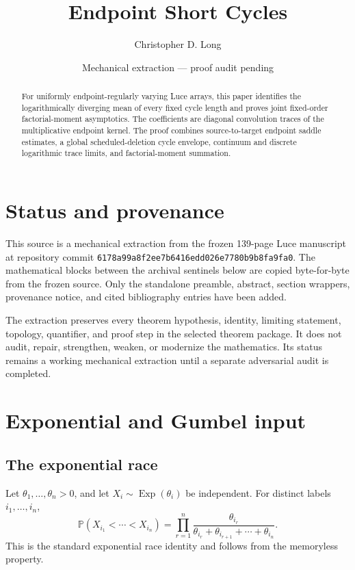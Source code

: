 \documentclass[11pt]{article}
\title{Endpoint Short Cycles}
\author{Christopher D. Long}
\date{Mechanical extraction --- proof audit pending}
\theoremstyle{remark}
\newcommand{\Pp}{\mathbb P}
\newcommand{\Exp}{\operatorname{Exp}}
\begin{document}
\maketitle
\begin{abstract}
For uniformly endpoint-regularly varying Luce arrays, this paper identifies the logarithmically diverging mean of every fixed cycle length and proves joint fixed-order factorial-moment asymptotics. The coefficients are diagonal convolution traces of the multiplicative endpoint kernel. The proof combines source-to-target endpoint saddle estimates, a global scheduled-deletion cycle envelope, continuum and discrete logarithmic trace limits, and factorial-moment summation.
\end{abstract}
\tableofcontents
\section{Status and provenance}
This source is a mechanical extraction from the frozen 139-page Luce manuscript at repository commit \texttt{6178a99a8f2ee7b6416edd026e7780b9b8fa9fa0}. The mathematical blocks between the archival sentinels below are copied byte-for-byte from the frozen source. Only the standalone preamble, abstract, section wrappers, provenance notice, and cited bibliography entries have been added.

The extraction preserves every theorem hypothesis, identity, limiting statement, topology, quantifier, and proof step in the selected theorem package. It does not audit, repair, strengthen, weaken, or modernize the mathematics. Its status remains a working mechanical extraction until a separate adversarial audit is completed.

\section{Exponential and Gumbel input}

\subsection{The exponential race}
Let \(\theta_1,\ldots,\theta_n>0\), and let \(X_i\sim\Exp(\theta_i)\) be independent.  For distinct labels \(i_1,\ldots,i_n\),
\[
\Pp(X_{i_1}<\cdots<X_{i_n})
= \prod_{r=1}^n
 \frac{\theta_{i_r}}{\theta_{i_r}+\theta_{i_{r+1}}+\cdots+\theta_{i_n}}.
\]
This is the standard exponential race identity and follows from the memoryless property.
\end{document}
